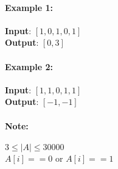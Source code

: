 \paragraph{Example 1:}
\begin{flushleft}
\textbf{Input}: $[1,0,1,0,1]$
\\
\textbf{Output}: $[0,3]$
\end{flushleft}
\paragraph{Example 2:}
\begin{flushleft}
\textbf{Input}: $[1,1,0,1,1]$
\\
\textbf{Output}: $[-1,-1]$
\end{flushleft}
\paragraph{Note:}
\begin{flushleft}
$3 \leq |A| \leq 30000$
\\
$A[i] == 0$ or $A[i] == 1$
\end{flushleft}
